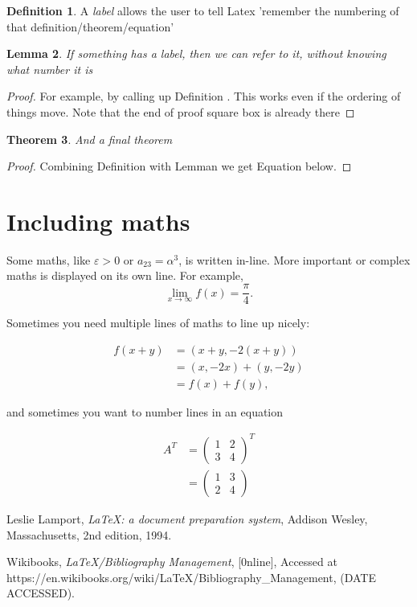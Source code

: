 \documentclass[a4paper,11pt]{article}
\newtheorem{theorem}{Theorem}[section]
\newtheorem{lemma}[theorem]{Lemma}
\theoremstyle{definition}
\newtheorem{definition}[theorem]{Definition}
\begin{document}
\begin{definition}\label{my_def}
	A \emph{label} allows the user to tell Latex 'remember the numbering of that definition/theorem/equation'
\end{definition}

\begin{lemma} \label{my_lem}
	If something has a label, then we can refer to it, without knowing what number it is 
\end{lemma}

\begin{proof}
	For example, by calling up Definition . This works even if the ordering of things move.
	Note that the end of proof square box is already there
\end{proof}

\begin{theorem}
	And a final theorem
\end{theorem}

\begin{proof}
	Combining Definition  with Lemman we get Equation  below.
\end{proof}

\section{Including maths}

Some maths, like $\varepsilon>0$ or $a_{23}=\alpha^3$, is written in-line. More important or complex maths is displayed on its own line.
For example, $$ \lim_{x\to\infty}f(x)=\frac{\pi}{4}.$$

Sometimes you need multiple lines of maths to line up nicely:

\begin{align*}
f(x+y)&=(x+y,-2(x+y))\\
&=(x,-2x)+(y,-2y)\\
&=f(x)+f(y),
\end{align*}

and sometimes you want to number lines in an equation

\begin{align}
A^{T} & =\begin{pmatrix}1 & 2\\
3 & 4
\end{pmatrix}^{T}\\
\label{my_eqn}  & =\begin{pmatrix}1 & 3\\
2 & 4
\end{pmatrix}
\end{align}






\begin{thebibliography}{99}

	  Leslie Lamport,
	  \textit{\LaTeX: a document preparation system},
	  Addison Wesley, Massachusetts,
	  2nd edition,
	  1994.
	  
		Wikibooks,
		\textit{LaTeX/Bibliography Management},
		[0nline],
		Accessed at https://en.wikibooks.org/wiki/LaTeX/Bibliography\_Management,
		(DATE ACCESSED).
		
	
	\end{thebibliography}
\end{document}
